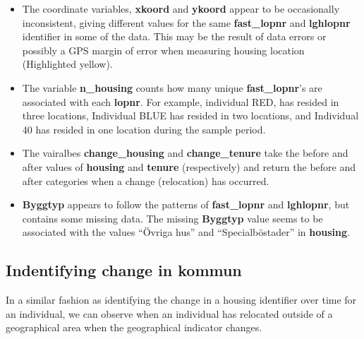 \documentclass[
]{book}
\begin{document}
\begin{itemize}
\item
  The coordinate variables, \textbf{xkoord} and \textbf{ykoord} appear to be occasionally inconsistent, giving different values for the same \textbf{fast\_lopnr} and \textbf{lghlopnr} identifier in some of the data. This may be the result of data errors or possibly a GPS margin of error when measuring housing location (Highlighted yellow).
\item
  The variable \textbf{n\_housing} counts how many unique \textbf{fast\_lopnr}'s are associated with each \textbf{lopnr}. For example, individual RED, has resided in three locations, Individual BLUE has resided in two locations, and Individual 40 has resided in one location during the sample period.
\item
  The vairalbes \textbf{change\_housing} and \textbf{change\_tenure} take the before and after values of \textbf{housing} and \textbf{tenure} (respectively) and return the before and after categories when a change (relocation) has occurred.
\item
  \textbf{Byggtyp} appears to follow the patterns of \textbf{fast\_lopnr} and \textbf{lghlopnr}, but contains some missing data. The missing \textbf{Byggtyp} value seems to be associated with the values ``Övriga hus'' and ``Specialböstader'' in \textbf{housing}.
\end{itemize}

\hypertarget{indentifying-change-in-kommun}{%
\subsection{Indentifying change in kommun}\label{indentifying-change-in-kommun}}

In a similar fashion as identifying the change in a housing identifier over time for an individual, we can observe when an individual has relocated outside of a geographical area when the geographical indicator changes.
\end{document}
